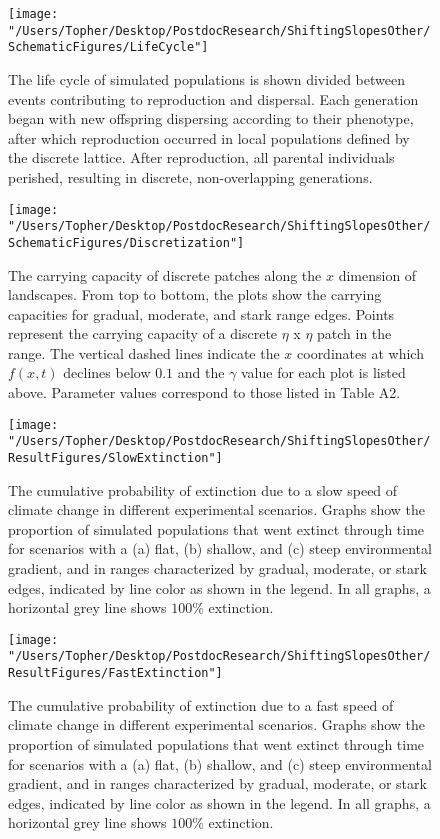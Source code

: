 \documentclass[11pt]{article}
\begin{document}
\clearpage

\begin{figure}[h!]
\texttt{[image: "/Users/Topher/Desktop/PostdocResearch/ShiftingSlopesOther/SchematicFigures/LifeCycle"]}
\caption{The life cycle of simulated populations is shown divided between events contributing to reproduction and dispersal. Each generation began with new offspring dispersing according to their phenotype, after which reproduction occurred in local populations defined by the discrete lattice. After reproduction, all parental individuals perished, resulting in discrete, non-overlapping generations.}
\label{Fig:LifeCycle}
\end{figure}

\clearpage

\begin{figure}[h!]
\texttt{[image: "/Users/Topher/Desktop/PostdocResearch/ShiftingSlopesOther/SchematicFigures/Discretization"]}
\caption{The carrying capacity of discrete patches along the $x$ dimension of landscapes. From top to bottom, the plots show the carrying capacities for gradual, moderate, and stark range edges. Points represent the carrying capacity of a discrete $\eta$ x $\eta$ patch in the range. The vertical dashed lines indicate the $x$ coordinates at which $f(x,t)$ declines below $0.1$ and the $\gamma$ value for each plot is listed above. Parameter values correspond to those listed in Table A2.}
\label{Fig:LifeCycle}
\end{figure}

\clearpage

\renewcommand{\thefigure}{B\arabic{figure}}
\setcounter{figure}{0}

\begin{figure}[h!]
\texttt{[image: "/Users/Topher/Desktop/PostdocResearch/ShiftingSlopesOther/ResultFigures/SlowExtinction"]}
\caption{The cumulative probability of extinction due to a slow speed of climate change in different experimental scenarios. Graphs show the proportion of simulated populations that went extinct through time for scenarios with a (a) flat, (b) shallow, and (c) steep environmental gradient, and in ranges characterized by gradual, moderate, or stark edges, indicated by line color as shown in the legend. In all graphs, a horizontal grey line shows $100\%$ extinction.}
\label{Fig:ExtProbSlow}
\end{figure}

\clearpage

\begin{figure}[h!]
\texttt{[image: "/Users/Topher/Desktop/PostdocResearch/ShiftingSlopesOther/ResultFigures/FastExtinction"]}
\caption{The cumulative probability of extinction due to a fast speed of climate change in different experimental scenarios. Graphs show the proportion of simulated populations that went extinct through time for scenarios with a (a) flat, (b) shallow, and (c) steep environmental gradient, and in ranges characterized by gradual, moderate, or stark edges, indicated by line color as shown in the legend. In all graphs, a horizontal grey line shows $100\%$ extinction.}
\label{Fig:ExtProbFast}
\end{figure}
\end{document}
